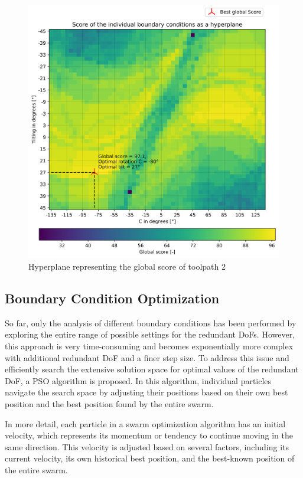 \begin{figure}[H]
	\centerline{\includegraphics[width=1\textwidth]{figures/best_2D_2.png}}
	\caption{Hyperplane representing the global score of toolpath 2}
	\label{best_2D_2}
\end{figure}


\newpage
\subsection{Boundary Condition Optimization }
So far, only the analysis of different boundary conditions has been performed by exploring the entire range of possible settings for the redundant \acrshort{DoF}s. However, this approach is very time-consuming and becomes exponentially more complex with additional redundant \acrshort{DoF} and a finer step size. To address this issue and efficiently search the extensive solution space for optimal values of the redundant \acrshort{DoF}, a \acrshort{PSO} algorithm is proposed. In this algorithm, individual particles navigate the search space by adjusting their positions based on their own best position and the best position found by the entire swarm. 

In more detail, each particle in a swarm optimization algorithm has an initial velocity, which represents its momentum or tendency to continue moving in the same direction. This velocity is adjusted based on several factors, including its current velocity, its own historical best position, and the best-known position of the entire swarm.

